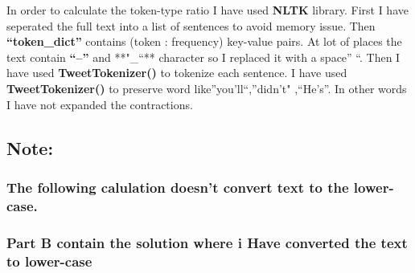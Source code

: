 \documentclass[11pt]{article}
\begin{document}
    In order to calculate the token-type ratio I have used \textbf{NLTK}
library. First I have seperated the full text into a list of sentences
to avoid memory issue. Then \textbf{``token\_dict''} contains (token :
frequency) key-value pairs. At lot of places the text contain
\textbf{``--''} and **"\_``** character so I replaced it with a space''
``. Then I have used \textbf{TweetTokenizer()} to tokenize each
sentence. I have used \textbf{TweetTokenizer()} to preserve word
like''you'll``,''didn't" ,``He's''. In other words I have not expanded
the contractions.

    \hypertarget{note}{%
\subsection{Note:}\label{note}}

\hypertarget{the-following-calulation-doesnt-convert-text-to-the-lower-case.}{%
\subsubsection{The following calulation doesn't convert text to the
lower-case.}\label{the-following-calulation-doesnt-convert-text-to-the-lower-case.}}

\hypertarget{part-b-contain-the-solution-where-i-have-converted-the-text-to-lower-case}{%
\subsubsection{Part B contain the solution where i Have converted the
text to
lower-case}\label{part-b-contain-the-solution-where-i-have-converted-the-text-to-lower-case}}
\end{document}
